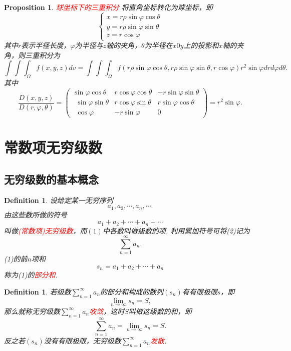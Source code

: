 \documentclass{article}
\newtheorem{proposition}[theorem]{Proposition}
\newtheorem{definition}[theorem]{Definition}
\newcommand{\redt}[1]{\textcolor{red}{#1}}
\begin{document}
\begin{proposition}
\rm \redt{球坐标下的三重积分} 将直角坐标转化为球坐标，即
$$
\left\{
\begin{array}{ll}
x = r\rho\sin\varphi\cos\theta \\
y = r\rho\sin\varphi\sin\theta \\
z = r\cos\varphi
\end{array}\right.
$$
其中$r$表示半径长度，$\varphi$为半径与$z$轴的夹角，$\theta$为半径在$x0y$上的投影和$x$轴的夹角，则三重积分为
$$
\int\int\int_{\Omega}f(x,y,z)dv = \int\int\int_{\Omega} f(r\rho\sin\varphi\cos\theta,r\rho\sin\varphi\sin\theta,r\cos\varphi)
r^2\sin\varphi dr d\varphi d\theta.
$$
其中
$$
\frac{D(x,y,z)}{D(r,\varphi,\theta)} =  \begin{pmatrix}\sin \varphi \cos \theta &r\cos \varphi \cos \theta &-r\sin \varphi \sin \theta \\ \:\:\sin \varphi \sin \theta &r\cos \varphi \sin \theta &r\sin \varphi \cos \theta \\ \:\:\cos \varphi &-r\sin \varphi &0\end{pmatrix} = r^2\sin\varphi.
$$
\end{proposition}

\newpage
\section{常数项无穷级数}

\subsection{无穷级数的基本概念}

\begin{definition}
\rm 设给定某一无穷序列
\begin{equation}
a_1,a_2,\cdots,a_n,\cdots.
\end{equation}
由这些数所做的符号
\begin{equation}
a_1 + a_2 + \cdots + a_n + \cdots
\end{equation}
叫做\redt{(常数项)无穷级数}，而$(1)$中各数叫做级数的项. 利用累加符号可将(2)记为
$$
\sum\limits_{n=1}^\infty a_n.
$$
(1)的前$n$项和
$$
s_n = a_1+a_2+\cdots+a_n
$$
称为(1)的\redt{部分和}.
\end{definition}

\begin{definition}
\rm 若级数$\sum\limits_{n=1}^\infty a_n$的部分和构成的数列$(s_n)$有有限极限$s$，即
$$
\lim\limits_{n \to \infty} s_n = S,
$$
那么就称无穷级数$\sum\limits_{n=1}^\infty a_n$\redt{收敛}，这时$S$叫做这级数的和，即
$$
\sum\limits_{n=1}^\infty a_n = \lim\limits_{n \to \infty} s_n = S.
$$
反之若$(s_n)$没有有限极限，无穷级数$\sum\limits_{n=1}^\infty a_n$\redt{发散}.
\end{definition}
\end{document}
